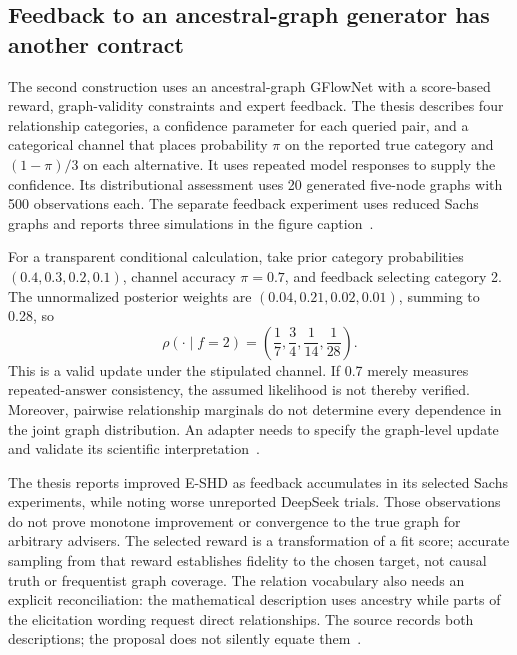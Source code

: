 \subsection{Feedback to an ancestral-graph generator has another contract}
The second construction uses an ancestral-graph GFlowNet with a score-based reward, graph-validity constraints and expert feedback. The thesis describes four relationship categories, a confidence parameter for each queried pair, and a categorical channel that places probability $\pi$ on the reported true category and $(1-\pi)/3$ on each alternative. It uses repeated model responses to supply the confidence. Its distributional assessment uses 20 generated five-node graphs with 500 observations each. The separate feedback experiment uses reduced Sachs graphs and reports three simulations in the figure caption~\citep{exec18_videira_thesis}.

For a transparent conditional calculation, take prior category probabilities $(0.4,0.3,0.2,0.1)$, channel accuracy $\pi=0.7$, and feedback selecting category 2. The unnormalized posterior weights are $(0.04,0.21,0.02,0.01)$, summing to 0.28, so
\begin{equation}
 \rho(\cdot\mid f=2)=\left(\frac17,\frac34,\frac1{14},\frac1{28}\right).
 \label{exec18:feedback-update}
\end{equation}
This is a valid update under the stipulated channel. If 0.7 merely measures repeated-answer consistency, the assumed likelihood is not thereby verified. Moreover, pairwise relationship marginals do not determine every dependence in the joint graph distribution. An adapter needs to specify the graph-level update and validate its scientific interpretation~\citep{exec18_bayesian_reference}.

The thesis reports improved E-SHD as feedback accumulates in its selected Sachs experiments, while noting worse unreported DeepSeek trials. Those observations do not prove monotone improvement or convergence to the true graph for arbitrary advisers. The selected reward is a transformation of a fit score; accurate sampling from that reward establishes fidelity to the chosen target, not causal truth or frequentist graph coverage. The relation vocabulary also needs an explicit reconciliation: the mathematical description uses ancestry while parts of the elicitation wording request direct relationships. The source records both descriptions; the proposal does not silently equate them~\citep{exec18_videira_thesis}.

